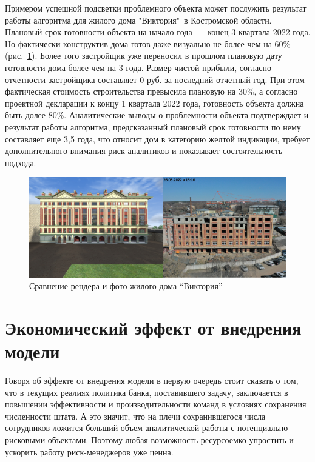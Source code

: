 \documentclass[12pt,a4paper]{article} %
\begin{document}
Примером успешной подсветки проблемного объекта может послужить результат работы алгоритма для жилого дома "Виктория"\ в Костромской области. Плановый срок готовности объекта на начало года~--- конец 3 квартала 2022 года. Но фактически конструктив дома готов даже визуально не более чем на 60\%(рис.~\ref{fig:house}). Более того застройщик уже переносил в прошлом плановую дату готовности дома более чем на 3 года. Размер чистой прибыли, согласно отчетности застройщика составляет 0 руб. за последний отчетный год. При этом фактическая стоимость строительства превысила плановую на 30\%, а согласно проектной декларации к концу 1 квартала 2022 года, готовность объекта должна быть долее 80\%. Аналитические выводы о проблемности объекта подтверждает и результат работы алгоритма, предсказанный плановый срок готовности по нему составляет еще 3,5 года, что относит дом в категорию желтой индикации, требует дополнительного внимания риск-аналитиков и показывает состоятельность подхода.

\begin{figure}[h]
	
	\centering
	
	\includegraphics[width=\linewidth]{house.jpg}
	
	\caption{Сравнение рендера и фото жилого дома ``Виктория''}
		
	\label{fig:house}
		
\end{figure} 


\newpage
\section{Экономический эффект от внедрения модели}
Говоря об эффекте от внедрения модели в первую очередь стоит сказать о том, что в текущих реалиях политика банка, поставившего задачу, заключается в повышении эффективности и производительности команд в условиях сохранения численности штата. А это значит, что на плечи сохранившегося числа сотрудников ложится больший объем аналитической работы с потенциально рисковыми объектами. Поэтому любая возможность ресурсоемко упростить и ускорить работу риск-менеджеров уже ценна.
\end{document}
